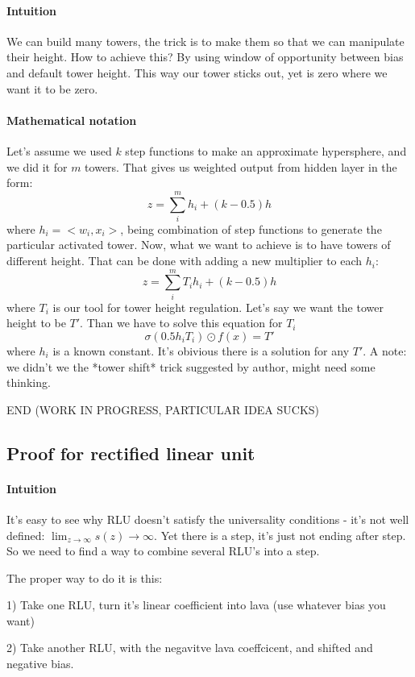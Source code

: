 \documentclass{article}
\begin{document}
\paragraph{Intuition}
We can build many towers, the trick is to make them so that we can manipulate their height.
How to achieve this? By using window of opportunity between bias and default tower height.
This way our tower sticks out, yet is zero where we want it to be zero.

\paragraph{Mathematical notation}
Let's assume we used $k$ step functions to make an approximate hypersphere, and we did it for $m$ towers.
That gives us weighted output from hidden layer in the form:
$$z = \sum_i^m h_i + (k-0.5)h$$
where $h_i = <w_i, x_i>$, being combination of step functions to generate the particular activated tower.
Now, what we want to achieve is to have towers of different height.
That can be done with adding a new multiplier to each $h_i$:
$$z = \sum_i^m T_i h_i + (k-0.5)h$$
where $T_i$ is our tool for tower height regulation. 
Let's say we want the tower height to be $T'$. Than we have to solve this equation for $T_i$
$$\sigma(0.5 h_i T_i) \odot f(x) = T'$$
where $h_i$ is a known constant. It's obivious there is a solution for any $T'$.
A note: we didn't we the *tower shift* trick suggested by author, might need some thinking.

END (WORK IN PROGRESS, PARTICULAR IDEA SUCKS)

\subsection{Proof for rectified linear unit}
\paragraph{Intuition}
It's easy to see why RLU doesn't satisfy the universality conditions - it's not well defined:
$\lim_{z \rightarrow \infty} s(z) \rightarrow \infty$.
Yet there is a step, it's just not ending after step. So we need to find a way to combine several RLU's into a step.

The proper way to do it is this:

1) Take one RLU, turn it's linear coefficient into lava (use whatever bias you want)

2) Take another RLU, with the negavitve lava coeffcicent, and shifted and negative bias. 
\end{document}
